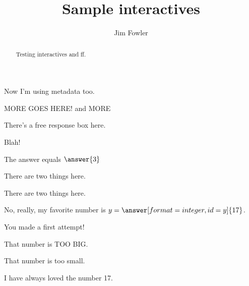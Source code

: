 \documentclass{ximera}
\title{Sample interactives}
\author{Jim Fowler}
\begin{document}
\begin{abstract}
Testing interactives and ff.
\end{abstract}
\maketitle

Now I'm using metadata too.

MORE GOES HERE!
and MORE

There's a free response box here.
\begin{freeResponse}
  
\end{freeResponse}

\begin{problem}
  Blah!
  \begin{prompt}
    The answer equals $\answer{3}$
  \end{prompt}  
\end{problem}

\begin{problem}
  There are two things here.
  \begin{ungraded}
    \begin{multipleChoice}
    \end{multipleChoice}
  \end{ungraded}
\end{problem}

\begin{problem}
\end{problem}


\begin{problem}
  There are two things here.
  \begin{multipleChoice}
  \end{multipleChoice}
\end{problem}

\begin{problem}
  No, really, my favorite number is $y = \answer[format=integer,id=y]{17}$.

  \begin{feedback}[attempt]
    You made a first attempt!
  \end{feedback}

  \begin{feedback}[y>17]
    That number is TOO BIG.
  \end{feedback}

  \begin{feedback}[y<17]
    That number is too small.
  \end{feedback}

  \begin{feedback}[correct]
    I have always loved the number 17.
  \end{feedback}
\end{problem}
\end{document}
